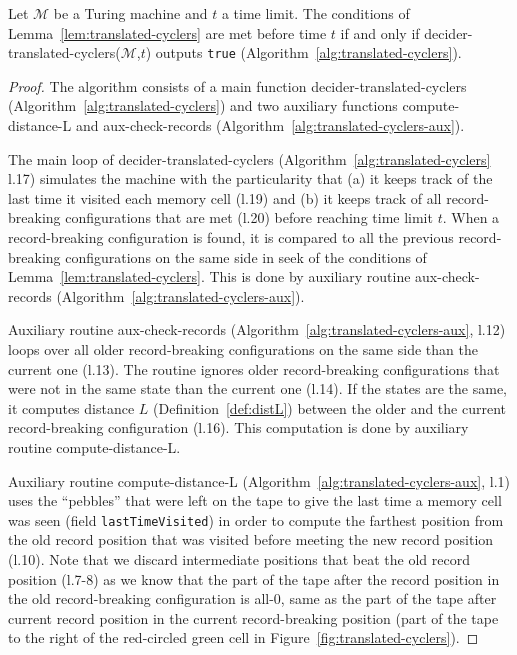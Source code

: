 \begin{theorem}\label{th:translated-cyclers}\normalfont
  Let $\mathcal{M}$ be a Turing machine and $t$ a time limit. The conditions of Lemma~\ref{lem:translated-cyclers} are met before time $t$ if and only if {\sc decider-translated-cyclers}($\mathcal{M}$,$t$) outputs \texttt{true} (Algorithm~\ref{alg:translated-cyclers}).
\end{theorem}
\begin{proof}
The algorithm consists of a main function {\sc decider-translated-cyclers} (Algorithm~\ref{alg:translated-cyclers}) and two auxiliary functions {\sc compute-distance-L} and {\sc aux-check-records} (Algorithm~\ref{alg:translated-cyclers-aux}).

The main loop of {\sc decider-translated-cyclers} (Algorithm~\ref{alg:translated-cyclers} l.17) simulates the machine with the particularity that (a) it keeps track of the last time it visited each memory cell (l.19) and (b) it keeps track of all record-breaking configurations that are met (l.20) before reaching time limit $t$. When a record-breaking configuration is found, it is compared to all the previous record-breaking configurations on the same side in seek of the conditions of Lemma~\ref{lem:translated-cyclers}. This is done by auxiliary routine {\sc aux-check-records} (Algorithm~\ref{alg:translated-cyclers-aux}).

Auxiliary routine {\sc aux-check-records} (Algorithm~\ref{alg:translated-cyclers-aux}, l.12) loops over all older record-breaking configurations on the same side than the current one (l.13). The routine ignores older record-breaking configurations that were not in the same state than the current one (l.14). If the states are the same, it computes distance $L$ (Definition~\ref{def:distL}) between the older and the current record-breaking configuration (l.16). This computation is done by auxiliary routine {\sc compute-distance-L}.

Auxiliary routine {\sc compute-distance-L} (Algorithm~\ref{alg:translated-cyclers-aux}, l.1) uses the ``pebbles'' that were left on the tape to give the last time a memory cell was seen (field \texttt{lastTimeVisited}) in order to compute the farthest position from the old record position that was visited before meeting the new record position (l.10). Note that we discard intermediate positions that beat the old record position (l.7-8) as we know that the part of the tape after the record position in the old record-breaking configuration is all-0, same as the part of the tape after current record position in the current record-breaking position (part of the tape to the right of the red-circled green cell in Figure~\ref{fig:translated-cyclers}).


\end{proof}
